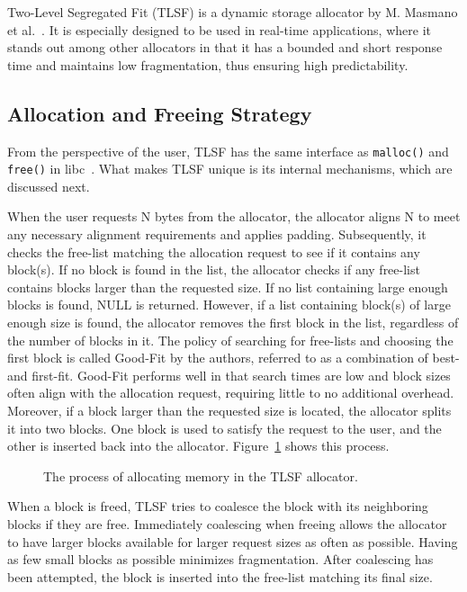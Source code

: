 
Two-Level Segregated Fit (TLSF) is a dynamic storage allocator by M. Masmano et al.~\cite{TLSF}. It is especially designed to be used in real-time applications, where it stands out among other allocators in that it has a bounded and short response time and maintains low fragmentation, thus ensuring high predictability. 

\subsection{Allocation and Freeing Strategy}

From the perspective of the user, TLSF has the same interface as \texttt{malloc()} and \texttt{free()} in libc~\cite{mallocman}. What makes TLSF unique is its internal mechanisms, which are discussed next.

When the user requests N bytes from the allocator, the allocator aligns N to meet any necessary alignment requirements and applies padding. Subsequently, it checks the free-list matching the allocation request to see if it contains any block(s). If no block is found in the list, the allocator checks if any free-list contains blocks larger than the requested size. If no list containing large enough blocks is found, NULL is returned. However, if a list containing block(s) of large enough size is found, the allocator removes the first block in the list, regardless of the number of blocks in it. The policy of searching for free-lists and choosing the first block is called Good-Fit by the authors, referred to as a combination of best- and first-fit. Good-Fit performs well in that search times are low and block sizes often align with the allocation request, requiring little to no additional overhead. Moreover, if a block larger than the requested size is located, the allocator splits it into two blocks. One block is used to satisfy the request to the user, and the other is inserted back into the allocator. Figure~\ref{fig:tlsf_allocation} shows this process.

\begin{figure}[h]
    \centering
    
    \caption{The process of allocating memory in the TLSF allocator.}
    \label{fig:tlsf_allocation}
\end{figure}

When a block is freed, TLSF tries to coalesce the block with its neighboring blocks if they are free. Immediately coalescing when freeing allows the allocator to have larger blocks available for larger request sizes as often as possible. Having as few small blocks as possible minimizes fragmentation. After coalescing has been attempted, the block is inserted into the free-list matching its final size.

